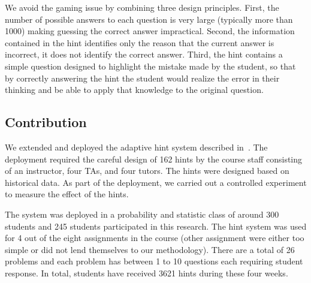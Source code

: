 \documentclass{llncs2e/llncs}
\begin{document}
We avoid the gaming issue by combining three design principles.
First, the number of possible answers to each question is very large (typically more than 1000) making guessing the correct answer impractical.  Second, the information contained in the hint
identifies only the reason that the current answer is incorrect, it
does not identify the correct answer. Third, the hint contains a
simple question designed to highlight the mistake made by the student, so that by correctly answering the hint the student would realize the error in their thinking and be able to apply that knowledge to the original question.

\subsection*{Contribution}

We extended and deployed the adaptive hint system described
in~\cite{ElkherjFreund14}. The deployment required the careful design of 162 hints by the course staff consisting of an instructor, four TAs, and four tutors. The hints were designed based on historical data. As part of the deployment, we carried out a controlled experiment to measure the effect of the hints. 

The system was deployed in a probability and statistic class of around 300 students and 245 students participated in this research. The hint system was used for 4 out of the eight assignments in the course (other assignment were either too simple or did not lend themselves to our methodology).  There are a total of 26 problems and each problem has between 1 to 10 questions each requiring student response. In total, students have received 3621 hints during these four weeks.
\end{document}
